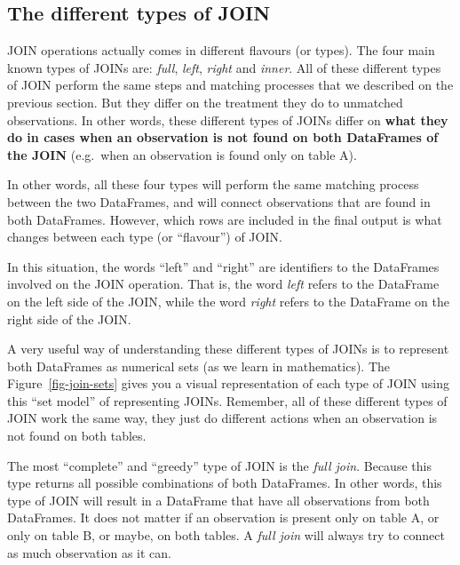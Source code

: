\documentclass[
  11pt,
  letterpaper,
  DIV=11,
  numbers=noendperiod]{scrreprt}
\begin{document}
\subsection{The different types of
JOIN}\label{the-different-types-of-join}

JOIN operations actually comes in different flavours (or types). The
four main known types of JOINs are: \emph{full}, \emph{left},
\emph{right} and \emph{inner}. All of these different types of JOIN
perform the same steps and matching processes that we described on the
previous section. But they differ on the treatment they do to unmatched
observations. In other words, these different types of JOINs differ on
\textbf{what they do in cases when an observation is not found on both
DataFrames of the JOIN} (e.g.~when an observation is found only on table
A).

In other words, all these four types will perform the same matching
process between the two DataFrames, and will connect observations that
are found in both DataFrames. However, which rows are included in the
final output is what changes between each type (or ``flavour'') of JOIN.

In this situation, the words ``left'' and ``right'' are identifiers to
the DataFrames involved on the JOIN operation. That is, the word
\emph{left} refers to the DataFrame on the left side of the JOIN, while
the word \emph{right} refers to the DataFrame on the right side of the
JOIN.

A very useful way of understanding these different types of JOINs is to
represent both DataFrames as numerical sets (as we learn in
mathematics). The Figure~\ref{fig-join-sets} gives you a visual
representation of each type of JOIN using this ``set model'' of
representing JOINs. Remember, all of these different types of JOIN work
the same way, they just do different actions when an observation is not
found on both tables.

The most ``complete'' and ``greedy'' type of JOIN is the \emph{full
join}. Because this type returns all possible combinations of both
DataFrames. In other words, this type of JOIN will result in a DataFrame
that have all observations from both DataFrames. It does not matter if
an observation is present only on table A, or only on table B, or maybe,
on both tables. A \emph{full join} will always try to connect as much
observation as it can.
\end{document}
